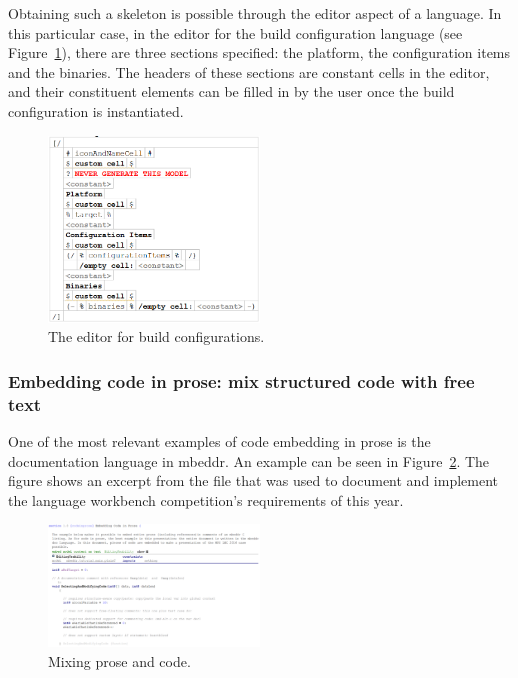\documentclass[preprint,numbers,10pt]{sigplanconf}
\begin{document}
Obtaining such a skeleton is possible through the editor aspect of a language. In this particular case,
in the editor for the build configuration language (see Figure~\ref{fig:buildConfigEditor}), there are three
sections specified: the platform, the configuration items and the binaries. The headers of these sections
are constant cells in the editor, and their constituent elements can be filled in by the user once the
build configuration is instantiated.

\begin{figure}[H]
	\centering
	\includegraphics[width=0.50\textwidth]{screens/BuildConfigurationEditor.png}
	\caption{The editor for build configurations.}
	\label{fig:buildConfigEditor}
\end{figure}
\subsubsection{Embedding code in prose: mix structured code with free text}
One of the most relevant examples of code embedding in prose is the documentation language in mbeddr.
An example can be seen in Figure~\ref{fig:CodeInProse}. The figure shows an excerpt from the file
that was used to document and implement the language workbench competition's requirements of this year.

\begin{figure}[H]
	\centering
	\includegraphics[width=0.50\textwidth]{screens/CodeInProse.png}
	\caption{Mixing prose and code.}
	\label{fig:CodeInProse}
\end{figure}
\end{document}
